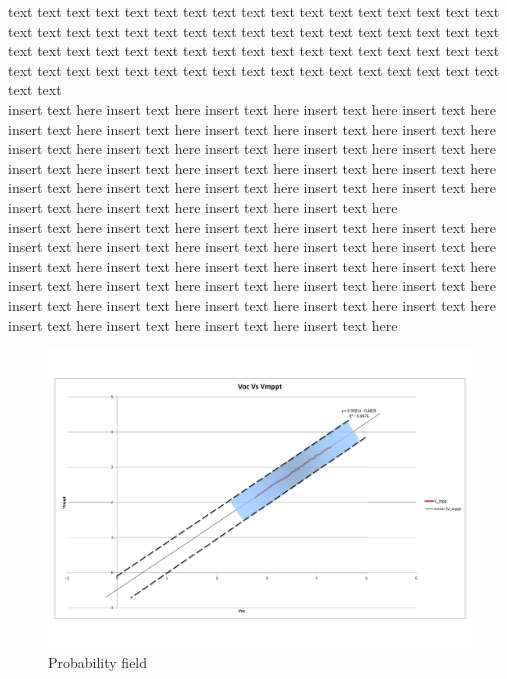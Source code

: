 text text text text text text text text text text text text text text text text text text text text text text text text text text text text text text text text text text text text text text text text text text text text text text text text text text text text text text text text text text text text text text text text text text text text text text  \\



insert text here insert text here insert text here insert text here insert text here
insert text here insert text here insert text here insert text here insert text here insert text here insert text here insert text here insert text here insert text here insert text here insert text here insert text here insert text here insert text here insert text here insert text here insert text here insert text here insert text here insert text here insert text here insert text here insert text here   \\

insert text here insert text here insert text here insert text here insert text here
insert text here insert text here insert text here insert text here insert text here insert text here insert text here insert text here insert text here insert text here insert text here insert text here insert text here insert text here insert text here insert text here insert text here insert text here insert text here insert text here insert text here insert text here insert text here insert text here   \\




\begin{figure}[H]
  \begin{center}
  \includegraphics[width=1.1\textwidth]{images/Probability_field}
  \caption{Probability field }
  \label{fig:Probability_field}
  \end{center}
\end{figure}

